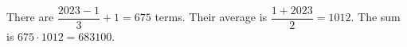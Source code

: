 There are $\dfrac{2023-1}{3}+1=675$ terms. Their average is $\dfrac{1+2023}{2}=1012$. The sum is $675\cdot1012=\boxed{683100}$.

